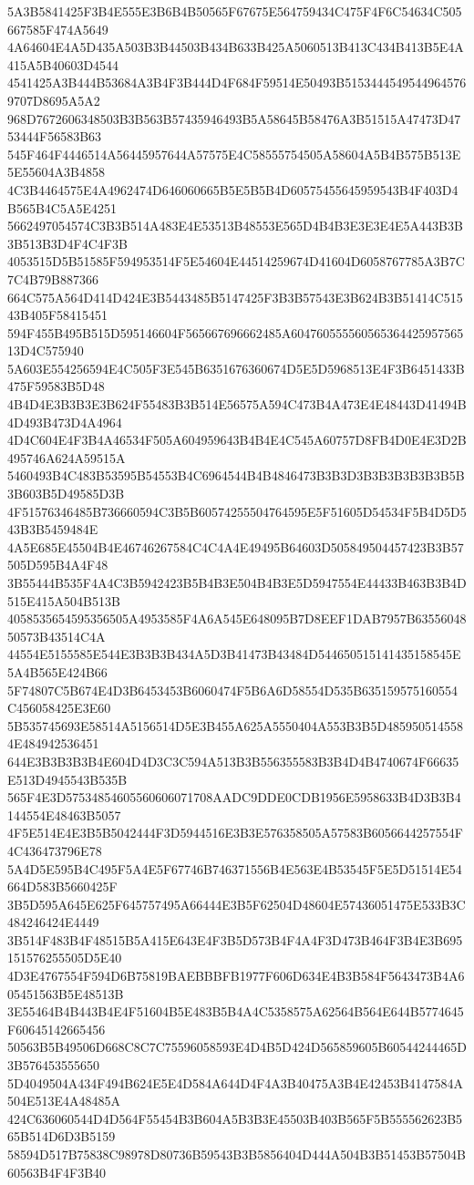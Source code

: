 {{{{{{{{{{{{{{{{{{{{{5A3B5841425F3B4E555E3B6B4B50565F67675E564759434C475F4F6C54634C505667585F474A5649
4A64604E4A5D435A503B3B44503B434B633B425A5060513B413C434B413B5E4A415A5B40603D4544
4541425A3B444B53684A3B4F3B444D4F684F59514E50493B51534445495449645769707D8695A5A2
968D7672606348503B3B563B57435946493B5A58645B58476A3B51515A47473D4753444F56583B63
545F464F4446514A56445957644A57575E4C58555754505A58604A5B4B575B513E5E55604A3B4858
4C3B4464575E4A4962474D646060665B5E5B5B4D60575455645959543B4F403D4B565B4C5A5E4251
5662497054574C3B3B514A483E4E53513B48553E565D4B4B3E3E3E4E5A443B3B3B513B3D4F4C4F3B
4053515D5B51585F594953514F5E54604E44514259674D41604D6058767785A3B7C7C4B79B887366
664C575A564D414D424E3B5443485B5147425F3B3B57543E3B624B3B51414C51543B405F58415451
594F455B495B515D595146604F565667696662485A60476055556056536442595756513D4C575940
5A603E554256594E4C505F3E545B6351676360674D5E5D5968513E4F3B6451433B475F59583B5D48
4B4D4E3B3B3E3B624F55483B3B514E56575A594C473B4A473E4E48443D41494B4D493B473D4A4964
4D4C604E4F3B4A46534F505A604959643B4B4E4C545A60757D8FB4D0E4E3D2B495746A624A59515A
5460493B4C483B53595B54553B4C6964544B4B4846473B3B3D3B3B3B3B3B3B5B3B603B5D49585D3B
4F51576346485B736660594C3B5B60574255504764595E5F51605D54534F5B4D5D543B3B5459484E
4A5E685E45504B4E46746267584C4C4A4E49495B64603D505849504457423B3B57505D595B4A4F48
3B55444B535F4A4C3B5942423B5B4B3E504B4B3E5D5947554E44433B463B3B4D515E415A504B513B
4058535654595356505A4953585F4A6A545E648095B7D8EEF1DAB7957B6355604850573B43514C4A
44554E5155585E544E3B3B3B434A5D3B41473B43484D544650515141435158545E5A4B565E424B66
5F74807C5B674E4D3B6453453B6060474F5B6A6D58554D535B635159575160554C456058425E3E60
5B535745693E58514A5156514D5E3B455A625A5550404A553B3B5D4859505145584E484942536451
644E3B3B3B3B4E604D4D3C3C594A513B3B556355583B3B4D4B4740674F66635E513D4945543B535B
565F4E3D57534854605560606071708AADC9DDE0CDB1956E5958633B4D3B3B4144554E48463B5057
4F5E514E4E3B5B5042444F3D5944516E3B3E576358505A57583B6056644257554F4C436473796E78
5A4D5E595B4C495F5A4E5F67746B746371556B4E563E4B53545F5E5D51514E54664D583B5660425F
3B5D595A645E625F645757495A66444E3B5F62504D48604E57436051475E533B3C484246424E4449
3B514F483B4F48515B5A415E643E4F3B5D573B4F4A4F3D473B464F3B4E3B695151576255505D5E40
4D3E4767554F594D6B75819BAEBBBFB1977F606D634E4B3B584F5643473B4A605451563B5E48513B
3E55464B4B443B4E4F51604B5E483B5B4A4C5358575A62564B564E644B5774645F60645142665456
50563B5B49506D668C8C7C75596058593E4D4B5D424D565859605B60544244465D3B576453555650
5D4049504A434F494B624E5E4D584A644D4F4A3B40475A3B4E42453B4147584A504E513E4A48485A
424C636060544D4D564F55454B3B604A5B3B3E45503B403B565F5B555562623B565B514D6D3B5159
58594D517B75838C98978D80736B59543B3B5856404D444A504B3B51453B57504B60563B4F4F3B40
}}}}}}}}}}}}}}}}}}}}}
